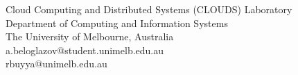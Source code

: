 Cloud Computing and Distributed Systems (CLOUDS) Laboratory\\
Department of Computing and Information Systems\\
The University of Melbourne, Australia\\
a.beloglazov@student.unimelb.edu.au\\
rbuyya@unimelb.edu.au
